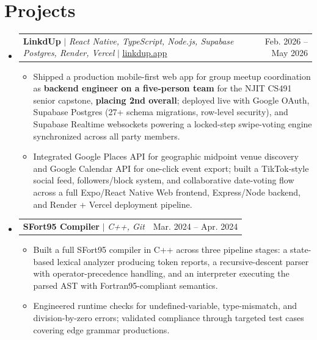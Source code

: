 \documentclass[letterpaper,10pt]{article}
\makeatletter
\newcommand{\resumeItem}[1]{\item\small{{#1 \vspace{-2pt}}}}
\newcommand{\resumeProjectHeading}[2]{
    \item
    \begin{tabular*}{0.97\textwidth}{l@{\extracolsep{\fill}}r}
      \small#1 & #2 \\
    \end{tabular*}\vspace{-7pt}
}
\newcommand{\resumeSubHeadingListStart}{\begin{itemize}[leftmargin=0.15in, label={}]}
\newcommand{\resumeSubHeadingListEnd}{\end{itemize}}
\newcommand{\resumeItemListStart}{\begin{itemize}[itemsep=0pt, parsep=1pt, topsep=2pt]}
\newcommand{\resumeItemListEnd}{\end{itemize}\vspace{-5pt}}
\makeatother
\begin{document}
\section{Projects}
    \resumeSubHeadingListStart
      \resumeProjectHeading
          {\textbf{LinkdUp} $|$ \emph{React Native, TypeScript, Node.js, Supabase Postgres, Render, Vercel} $|$ \href{https://linkdup.app}{\underline{linkdup.app}}}{Feb. 2026 -- May 2026}
          \resumeItemListStart
            \resumeItem{Shipped a production mobile-first web app for group meetup coordination as \textbf{backend engineer on a five-person team} for the NJIT CS491 senior capstone, \textbf{placing 2nd overall}; deployed live with Google OAuth, Supabase Postgres (27+ schema migrations, row-level security), and Supabase Realtime websockets powering a locked-step swipe-voting engine synchronized across all party members.}
            \resumeItem{Integrated Google Places API for geographic midpoint venue discovery and Google Calendar API for one-click event export; built a TikTok-style social feed, followers/block system, and collaborative date-voting flow across a full Expo/React Native Web frontend, Express/Node backend, and Render + Vercel deployment pipeline.}
          \resumeItemListEnd

      \resumeProjectHeading
          {\textbf{SFort95 Compiler} $|$ \emph{C++, Git}}{Mar. 2024 -- Apr. 2024}
          \resumeItemListStart
            \resumeItem{Built a full SFort95 compiler in C++ across three pipeline stages: a state-based lexical analyzer producing token reports, a recursive-descent parser with operator-precedence handling, and an interpreter executing the parsed AST with Fortran95-compliant semantics.}
            \resumeItem{Engineered runtime checks for undefined-variable, type-mismatch, and division-by-zero errors; validated compliance through targeted test cases covering edge grammar productions.}
          \resumeItemListEnd
    \resumeSubHeadingListEnd
\end{document}
